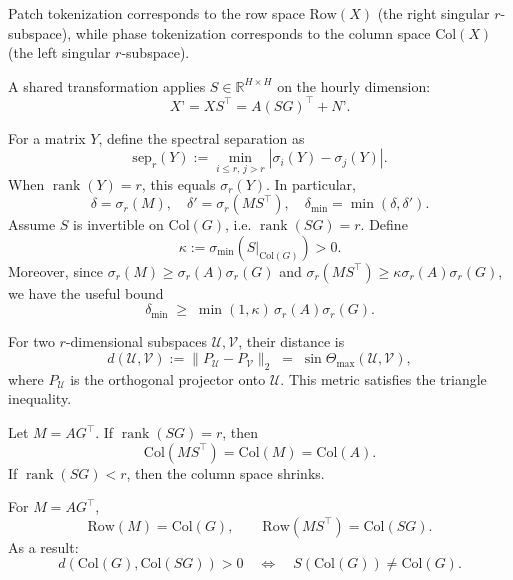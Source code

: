 Patch tokenization corresponds to the row space $\mathrm{Row}(X)$ (the right singular $r$-subspace), while phase tokenization corresponds to the column space $\mathrm{Col}(X)$ (the left singular $r$-subspace).

A shared transformation applies $S\in\mathbb{R}^{H\times H}$ on the hourly dimension:
\[
X’ = X S^\top = A (S G)^\top + N’.
\]


For a matrix $Y$, define the spectral separation as
\[
\mathrm{sep}_r(Y) := \min_{i\le r,\,j>r}|\sigma_i(Y)-\sigma_j(Y)|.
\]
When $\operatorname{rank}(Y)=r$, this equals $\sigma_r(Y)$. In particular,
\[
\delta = \sigma_r(M), \quad \delta'=\sigma_r(MS^\top), \quad
\delta_{\min}=\min(\delta,\delta').
\]
Assume $S$ is invertible on $\mathrm{Col}(G)$, i.e. $\operatorname{rank}(S G)=r$. Define
\[
\kappa := \sigma_{\min}(S|_{\mathrm{Col}(G)})>0.
\]
Moreover, since $\sigma_r(M)\ge\sigma_r(A)\sigma_r(G)$ and 
$\sigma_r(MS^\top)\ge \kappa\sigma_r(A)\sigma_r(G)$, we have the useful bound
\[
\delta_{\min}\;\ge\;\min(1,\kappa)\,\sigma_r(A)\sigma_r(G).
\]

For two $r$-dimensional subspaces $\mathcal U,\mathcal V$, their distance is
\[
d(\mathcal U,\mathcal V) := \|P_{\mathcal U}-P_{\mathcal V}\|_2 \;=\; \sin\Theta_{\max}(\mathcal U,\mathcal V),
\]
where $P_{\mathcal U}$ is the orthogonal projector onto $\mathcal U$. 
This metric satisfies the triangle inequality.

\begin{lemma}
Let $M=A G^\top$. If $\operatorname{rank}(S G)=r$, then
\[
\mathrm{Col}(M S^\top) = \mathrm{Col}(M) = \mathrm{Col}(A).
\]
If $\operatorname{rank}(S G)<r$, then the column space shrinks.
\end{lemma}

\begin{lemma}
For $M=A G^\top$,
\[
\mathrm{Row}(M) = \mathrm{Col}(G), \qquad \mathrm{Row}(M S^\top) = \mathrm{Col}(S G).
\]
As a result:
\[
d(\mathrm{Col}(G),\mathrm{Col}(S G))>0 \quad \Longleftrightarrow \quad S(\mathrm{Col}(G)) \neq \mathrm{Col}(G).
\]
\end{lemma}

